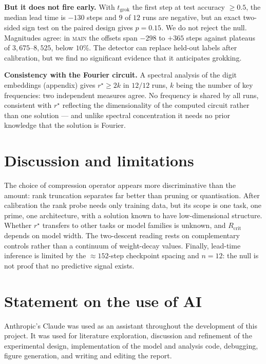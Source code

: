 \documentclass{article}
\begin{document}
\textbf{But it does not fire early.} With $t_{\text{grok}}$ the first step at test
accuracy $\geq 0.5$, the median lead time is $-130$ steps and $9$ of $12$ runs are
negative, but an exact two-sided sign test on the paired design gives $p=0.15$. We do not reject the null. Magnitudes agree: in \textsc{main} the offsets span $-298$
to $+365$ steps against plateaus of $3{,}675$--$8{,}525$, below $10\%$. The detector can replace held-out labels after calibration, but we find no significant evidence that it anticipates grokking.

\textbf{Consistency with the Fourier circuit.} A spectral analysis of the digit embeddings
(appendix) gives $r^\star \geq 2k$ in $12/12$ runs, $k$ being the number of key
frequencies: two independent measures agree. No frequency is shared by all
runs, consistent with $r^\star$ reflecting the dimensionality of the computed circuit
rather than one solution --- and unlike spectral concentration it needs no prior
knowledge that the solution is Fourier.

\section{Discussion and limitations}

The choice of compression operator appears more discriminative than the amount: rank
truncation separates far better than pruning or quantisation. After calibration the
rank probe needs only training data, but its scope is one task, one prime, one
architecture, with a solution known to have low-dimensional structure. Whether $r^\star$ transfers to other tasks or model families is unknown, and
$R_{\text{crit}}$ depends on model width. The two-descent reading rests on
complementary controls rather than a continuum of weight-decay values. Finally,
lead-time inference is limited by the ${\approx}152$-step checkpoint spacing and
$n=12$: the null is not proof that no predictive signal exists.


\section*{Statement on the use of AI}\label{sec:ai}
%
Anthropic’s Claude was used as an assistant throughout the development of this project. It was used for literature exploration, discussion and refinement of the experimental design, implementation of the model and analysis code, debugging, figure generation, and writing and editing the report.
\end{document}

